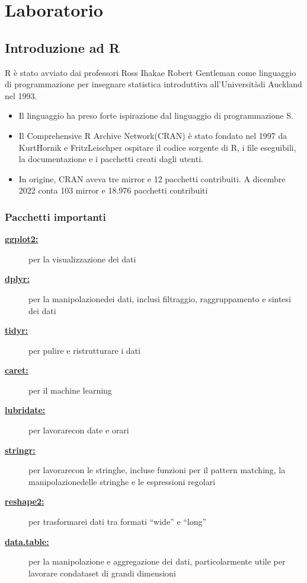 
\chapter{Laboratorio}

      \section{Introduzione ad R}

         R è stato avviato dai professori Ross Ihakae Robert Gentleman come linguaggio di programmazione 
per insegnare statistica introduttiva all’Universitàdi Auckland nel 1993.
\begin{itemize}
  \item Il linguaggio ha preso forte ispirazione dal linguaggio di programmazione S.
  \item Il Comprehensive R Archive Network(CRAN) è stato fondato nel 1997 da KurtHornik e FritzLeischper ospitare il codice sorgente di R, i file eseguibili, la documentazione e i pacchetti creati dagli utenti.
  \item In origine, CRAN aveva tre mirror e 12 pacchetti contribuiti. A dicembre 2022 conta 103 mirror e 18.976 pacchetti contribuiti
\end{itemize}

\subsection{Pacchetti importanti}
\begin{description}
  \item[\textbf{\underline{ggplot2:}}] per la visualizzazione dei dati 
  \item[\textbf{\underline{dplyr:}}] per la manipolazionedei dati, inclusi filtraggio, raggruppamento e sintesi dei dati
\item[\textbf{\underline{tidyr:}}] per pulire e ristrutturare i dati
\item[\textbf{\underline{caret:}}] per il machine learning
\item[\textbf{\underline{lubridate:}}] per lavorarecon date e orari
\item[\textbf{\underline{stringr:}}] per lavorarecon le stringhe, incluse funzioni per il pattern matching, la manipolazionedelle stringhe e le espressioni regolari
\item[\textbf{\underline{reshape2:}}] per trasformarei dati tra formati “wide” e “long”
\item[\textbf{\underline{data.table:}}]per la manipolazione e aggregazione dei dati, particolarmente utile per lavorare
condataset di grandi dimensioni

\end{description}

